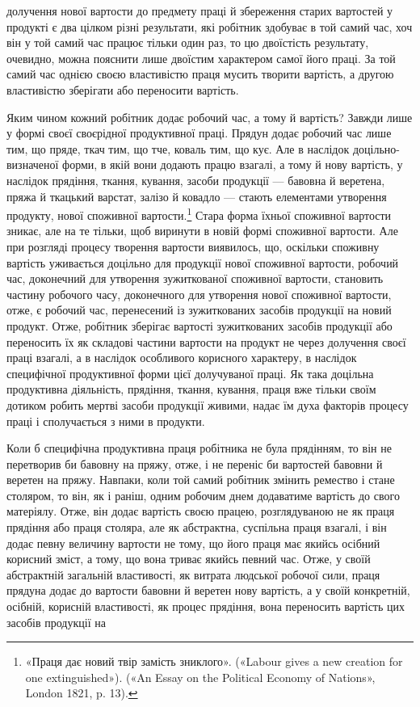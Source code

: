 долучення нової вартости до предмету праці й збереження старих
вартостей у продукті є два цілком різні результати, які робітник
здобуває в той самий час, хоч він у той самий час працює
тільки один раз, то цю двоїстість результату, очевидно, можна
пояснити лише двоїстим характером самої його праці. За той
самий час однією своєю властивістю праця мусить творити вартість,
а другою властивістю зберігати або переносити вартість.

Яким чином кожний робітник додає робочий час, а тому й
вартість? Завжди лише у формі своєї своєрідної продуктивної
праці. Прядун додає робочий час лише тим, що пряде, ткач тим,
що тче, коваль тим, що кує. Але в наслідок доцільно-визначеної
форми, в якій вони додають працю взагалі, а тому й нову вартість,
у наслідок прядіння, ткання, кування, засоби продукції — бавовна
й веретена, пряжа й ткацький варстат, залізо й ковадло — стають
елементами утворення продукту, нової споживної вартости.\footnote{
«Праця дає новий твір замість зниклого». («Labour gives a new
creation for one extinguished»). («An Essay on the Political Economy of
Nations», London 1821, p. 13).
}
Стара форма їхньої споживної вартости зникає, але на те тільки,
щоб виринути в новій формі споживної вартости. Але при розгляді
процесу творення вартости виявилось, що, оскільки споживну
вартість уживається доцільно для продукції нової споживної
вартости, робочий час, доконечний для утворення зужиткованої
споживної вартости, становить частину робочого часу, доконечного
для утворення нової споживної вартости, отже, є робочий
час, перенесений із зужиткованих засобів продукції на новий
продукт. Отже, робітник зберігає вартості зужиткованих засобів
продукції або переносить їх як складові частини вартости на продукт
не через долучення своєї праці взагалі, а в наслідок особливого
корисного характеру, в наслідок специфічної продуктивної
форми цієї долучуваної праці. Як така доцільна продуктивна
діяльність, прядіння, ткання, кування, праця вже тільки своїм
дотиком робить мертві засоби продукції живими, надає їм духа
факторів процесу праці і сполучається з ними в продукти.

Коли б специфічна продуктивна праця робітника не була прядінням,
то він не перетворив би бавовну на пряжу, отже, і не
переніс би вартостей бавовни й веретен на пряжу. Навпаки, коли
той самий робітник змінить ремество і стане столяром, то він,
як і раніш, одним робочим днем додаватиме вартість до свого
матеріялу. Отже, він додає вартість своєю працею, розглядуваною
не як праця прядіння або праця столяра, але як абстрактна,
суспільна праця взагалі, і він додає певну величину вартости не
тому, що його праця має якийсь осібний корисний зміст, а тому,
що вона триває якийсь певний час. Отже, у своїй абстрактній
загальній властивості, як витрата людської робочої сили, праця
прядуна додає до вартости бавовни й веретен нову вартість, а
у своїй конкретній, осібній, корисній властивості, як процес
прядіння, вона переносить вартість цих засобів продукції на